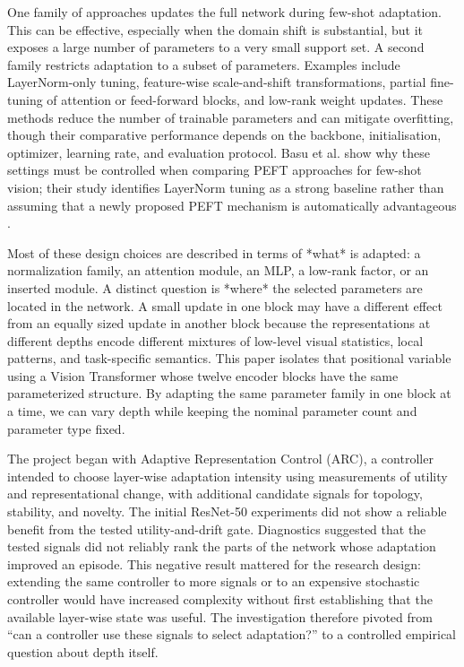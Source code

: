 \documentclass[11pt]{article}
\begin{document}
One family of approaches updates the full network during few-shot adaptation. This can be effective, especially when the domain shift is substantial, but it exposes a large number of parameters to a very small support set. A second family restricts adaptation to a subset of parameters. Examples include LayerNorm-only tuning, feature-wise scale-and-shift transformations, partial fine-tuning of attention or feed-forward blocks, and low-rank weight updates. These methods reduce the number of trainable parameters and can mitigate overfitting, though their comparative performance depends on the backbone, initialisation, optimizer, learning rate, and evaluation protocol. Basu et al. show why these settings must be controlled when comparing PEFT approaches for few-shot vision; their study identifies LayerNorm tuning as a strong baseline rather than assuming that a newly proposed PEFT mechanism is automatically advantageous \cite{basu2024}.

Most of these design choices are described in terms of *what* is adapted: a normalization family, an attention module, an MLP, a low-rank factor, or an inserted module. A distinct question is *where* the selected parameters are located in the network. A small update in one block may have a different effect from an equally sized update in another block because the representations at different depths encode different mixtures of low-level visual statistics, local patterns, and task-specific semantics. This paper isolates that positional variable using a Vision Transformer whose twelve encoder blocks have the same parameterized structure. By adapting the same parameter family in one block at a time, we can vary depth while keeping the nominal parameter count and parameter type fixed.

The project began with Adaptive Representation Control (ARC), a controller intended to choose layer-wise adaptation intensity using measurements of utility and representational change, with additional candidate signals for topology, stability, and novelty. The initial ResNet-50 experiments did not show a reliable benefit from the tested utility-and-drift gate. Diagnostics suggested that the tested signals did not reliably rank the parts of the network whose adaptation improved an episode. This negative result mattered for the research design: extending the same controller to more signals or to an expensive stochastic controller would have increased complexity without first establishing that the available layer-wise state was useful. The investigation therefore pivoted from “can a controller use these signals to select adaptation?” to a controlled empirical question about depth itself.
\end{document}
